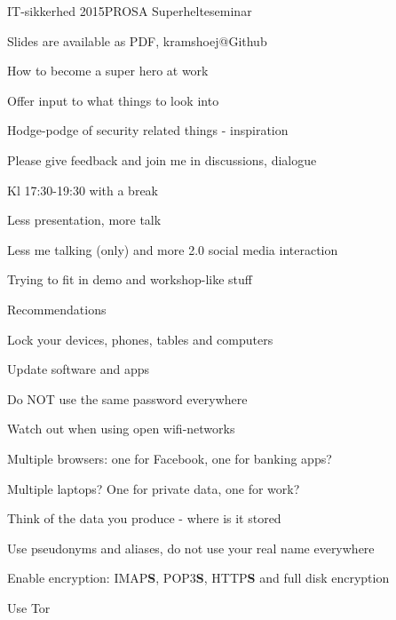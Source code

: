 \documentclass[20pt,landscape,a4paper,footrule]{foils}
\begin{document}

\mytitlepage
{IT-sikkerhed 2015}{PROSA Superhelteseminar}


%


\vskip 2cm
\centerline{\tiny Slides are available as PDF, kramshoej@Github}



\begin{list1}
\item How to become a super hero at work
\item Offer input to what things to look into
\item Hodge-podge of security related things - inspiration
\item Please give feedback and join me in discussions, dialogue \smiley
\end{list1}



\begin{list1}
\item Kl 17:30-19:30 with a break
\item Less presentation, more talk
\item Less me talking (only) and more 2.0 social media interaction
\end{list1}

\centerline{Trying to fit in demo and workshop-like stuff}


Recommendations 
\begin{list2}
\item Lock your devices, phones, tables and computers
\item Update software and apps
\item Do NOT use the same password everywhere
\item Watch out when using open wifi-networks
\item Multiple browsers: one for Facebook, one for banking apps?
\item Multiple laptops? One for private data, one for work?
\item Think of the data you produce - where is it stored
\item Use pseudonyms and aliases, do not use your real name everywhere
\item Enable encryption: IMAP{\bf S}, POP3{\bf S},
  HTTP{\bf S} and full disk encryption
\item Use Tor 
\end{list2}
\end{document}
